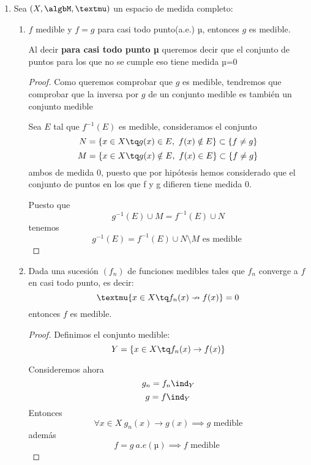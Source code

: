 \documentclass{apuntes}
\begin{document}
\begin{enumerate}
\begin{enumerate}
\begin{proof}
Ahora bien, fijado x tenemos:
\[f(x)= Re^{\pm}f(x)+i Im^{\pm}f(x)\]
\[\varphi_n(x)= \Psi^{\pm}(x)+i \varsigma^{\pm}(x)\]
Donde la selección del signo para cada x es siempre la misma y determinada por el signo de $Re(f)$ e $Im(f)$ respectivamente.

Además,
\[\lim \varphi_n (x)= f(x)\]
\[|\varphi_n|^2 = |\Psi_n|^2+|\varsigma_n|^2\]

\end{proof}
\end{enumerate}

\item Sea $(X, \algbM, µ)$ un espacio de medida completo:
\begin{enumerate}
\item $f$ medible y $f=g$ para casi todo punto(a.e.) µ, entonces $g$ es medible.

Al decir \textbf{para casi todo punto µ} queremos decir que el conjunto de puntos para los que no se cumple eso tiene medida µ=0
\begin{proof}
Como queremos comprobar que $g$ es medible, tendremos que comprobar que la inversa por $g$ de un conjunto medible es también un conjunto medible

Sea $E$ tal que $f^{-1}(E)$ es medible, consideramos el conjunto
\[N= \{x \in X \tq g(x)\in E, \ f(x) \notin E\}\subset \{f \neq g\}\]
\[M= \{x \in X \tq g(x)\notin E, \ f(x) \in E\}\subset \{f \neq g\}\]
ambos de medida 0, puesto que por hipótesis hemos considerado que el conjunto de puntos en los que f y g difieren tiene medida 0.

Puesto que
\[g^{-1}(E) \cup M = f^{-1}(E)\cup N\]
tenemos
\[g^{-1}(E) = f^{-1}(E)\cup N \setminus M \text{ es medible }\]
\end{proof}

\newpage
\item Dada una sucesión $(f_n)$ de funciones medibles tales que $f_n$ converge a $f$ en casi todo punto, es decir:
\[µ\{x \in X \tq f_n(x) \nrightarrow f(x)\} = 0\]
entonces $f$ es medible.

\begin{proof}
Definimos el conjunto medible:
\[Y=\{x \in X \tq f_n(x)\rightarrow f(x)\}\]

Consideremos ahora
\[g_n = f_n \ind_Y\]
\[g = f \ind_Y\]
Entonces
\[\forall x \in X \ g_n(x) \rightarrow g(x) \implies g \text{ medible}\]
además
\[f=g \ a.e(µ) \implies f \text{ medible }\]
\end{proof}
\end{enumerate}


\end{enumerate}
\end{document}
